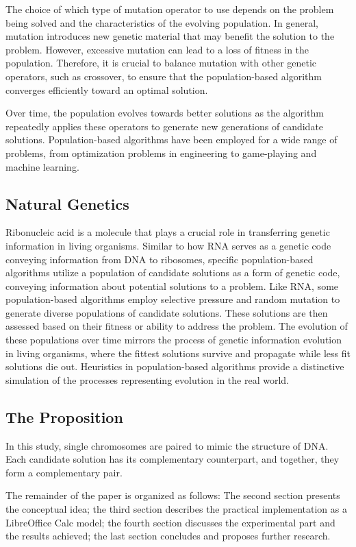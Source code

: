 \documentclass[runningheads]{llncs}
\begin{document}
The choice of which type of mutation operator to use depends on the problem being solved and the characteristics of the evolving population. In general, mutation introduces new genetic material that may benefit the solution to the problem. However, excessive mutation can lead to a loss of fitness in the population. Therefore, it is crucial to balance mutation with other genetic operators, such as crossover, to ensure that the population-based algorithm converges efficiently toward an optimal solution.

Over time, the population evolves towards better solutions as the algorithm repeatedly applies these operators to generate new generations of candidate solutions. Population-based algorithms have been employed for a wide range of problems, from optimization problems in engineering to game-playing and machine learning.

\subsection{Natural Genetics}

Ribonucleic acid is a molecule that plays a crucial role in transferring genetic information in living organisms. Similar to how RNA serves as a genetic code conveying information from DNA to ribosomes, specific population-based algorithms utilize a population of candidate solutions as a form of genetic code, conveying information about potential solutions to a problem. Like RNA, some population-based algorithms employ selective pressure and random mutation to generate diverse populations of candidate solutions. These solutions are then assessed based on their fitness or ability to address the problem. The evolution of these populations over time mirrors the process of genetic information evolution in living organisms, where the fittest solutions survive and propagate while less fit solutions die out. Heuristics in population-based algorithms provide a distinctive simulation of the processes representing evolution in the real world.

\subsection*{The Proposition}

In this study, single chromosomes are paired to mimic the structure of DNA. Each candidate solution has its complementary counterpart, and together, they form a complementary pair.

The remainder of the paper is organized as follows: The second section presents the conceptual idea; the third section describes the practical implementation as a LibreOffice Calc model; the fourth section discusses the experimental part and the results achieved; the last section concludes and proposes further research.
\end{document}

